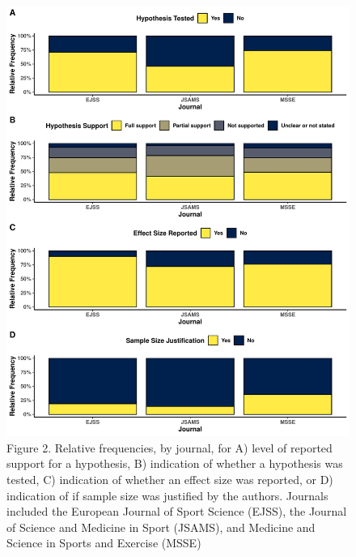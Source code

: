 \documentclass[]{cik}%
\begin{document}
\newpage

\begin{figure}[H]
\includegraphics[width=1\linewidth]{figure2} \caption{Figure 2. Relative frequencies, by journal, for A) level of reported support for a hypothesis, B) indication of whether a hypothesis was tested, C) indication of whether an effect size was reported, or D) indication of if sample size was justified by the authors. Journals included the European Journal of Sport Science (EJSS), the Journal of Science and Medicine in Sport (JSAMS), and Medicine and Science in Sports and Exercise (MSSE)}\label{fig:fig2}
\end{figure}

\newpage
\end{document}
